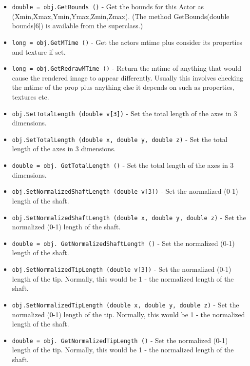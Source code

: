 \begin{itemize}
\item  \verb|double = obj.GetBounds ()| -  Get the bounds for this Actor as (Xmin,Xmax,Ymin,Ymax,Zmin,Zmax). (The
 method GetBounds(double bounds[6]) is available from the superclass.)

\item  \verb|long = obj.GetMTime ()| -  Get the actors mtime plus consider its properties and texture if set.

\item  \verb|long = obj.GetRedrawMTime ()| -  Return the mtime of anything that would cause the rendered image to 
 appear differently. Usually this involves checking the mtime of the 
 prop plus anything else it depends on such as properties, textures
 etc.

\item  \verb|obj.SetTotalLength (double v[3])| -  Set the total length of the axes in 3 dimensions.

\item  \verb|obj.SetTotalLength (double x, double y, double z)| -  Set the total length of the axes in 3 dimensions.

\item  \verb|double = obj. GetTotalLength ()| -  Set the total length of the axes in 3 dimensions.

\item  \verb|obj.SetNormalizedShaftLength (double v[3])| -  Set the normalized (0-1) length of the shaft.

\item  \verb|obj.SetNormalizedShaftLength (double x, double y, double z)| -  Set the normalized (0-1) length of the shaft.

\item  \verb|double = obj. GetNormalizedShaftLength ()| -  Set the normalized (0-1) length of the shaft.

\item  \verb|obj.SetNormalizedTipLength (double v[3])| -  Set the normalized (0-1) length of the tip.  Normally, this would be
 1 - the normalized length of the shaft.

\item  \verb|obj.SetNormalizedTipLength (double x, double y, double z)| -  Set the normalized (0-1) length of the tip.  Normally, this would be
 1 - the normalized length of the shaft.

\item  \verb|double = obj. GetNormalizedTipLength ()| -  Set the normalized (0-1) length of the tip.  Normally, this would be
 1 - the normalized length of the shaft.


\end{itemize}
